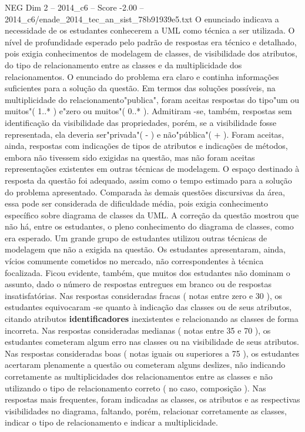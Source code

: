 \begin{textsample}{NEG Dim 2 – 2014\_c6 – Score -2.00 – 2014\_c6/enade\_2014\_tec\_an\_sist\_78b91939e5.txt}
O enunciado indicava a necessidade de os estudantes conhecerem a UML como técnica a ser utilizada.
O nível de profundidade esperado pelo padrão de respostas era técnico e detalhado, pois exigia conhecimentos de modelagem de classes, de visibilidade dos atributos, do tipo de relacionamento entre as classes e da multiplicidade dos relacionamentos.
O enunciado do problema era claro e continha informações suficientes para a solução da questão.
Em termos das soluções possíveis, na multiplicidade do relacionamento"publica", foram aceitas respostas do tipo"um ou muitos"( 1..* ) e"zero ou muitos"( 0..* ).
Admitiram -se, também, respostas sem identificação da visibilidade das propriedades, porém, se a visibilidade fosse representada, ela deveria ser"privada"( - ) e não"pública"( + ).
Foram aceitas, ainda, respostas com indicações de tipos de atributos e indicações de métodos, embora não tivessem sido exigidas na questão, mas não foram aceitas representações existentes em outras técnicas de modelagem.
O espaço destinado à resposta da questão foi adequado, assim como o tempo estimado para a solução do problema apresentado.
Comparada às demais questões discursivas da área, essa pode ser considerada de dificuldade média, pois exigia conhecimento específico sobre diagrama de classes da UML.
A correção da questão mostrou que não há, entre os estudantes, o pleno conhecimento do diagrama de classes, como era esperado.
Um grande grupo de estudantes utilizou outras técnicas de modelagem que não a exigida na questão.
Os estudantes apresentaram, ainda, vícios comumente cometidos no mercado, não correspondentes à técnica focalizada.
Ficou evidente, também, que muitos dos estudantes não dominam o assunto, dado o número de respostas entregues em branco ou de respostas insatisfatórias.
Nas respostas consideradas fracas ( notas entre zero e 30 ), os estudantes equivocaram -se quanto à indicação das classes ou de seus atributos, citando atributos \textbf{identificadores} inexistentes e relacionando as classes de forma incorreta.
Nas respostas consideradas medianas ( notas entre 35 e 70 ), os estudantes cometeram algum erro nas classes ou na visibilidade de seus atributos.
Nas respostas consideradas boas ( notas iguais ou superiores a 75 ), os estudantes acertaram plenamente a questão ou cometeram alguns deslizes, não indicando corretamente as multiplicidades dos relacionamentos entre as classes e não utilizando o tipo de relacionamento correto ( no caso, composição ).
Nas respostas mais frequentes, foram indicadas as classes, os atributos e as respectivas visibilidades no diagrama, faltando, porém, relacionar corretamente as classes, indicar o tipo de relacionamento e indicar a multiplicidade.

\end{textsample}
